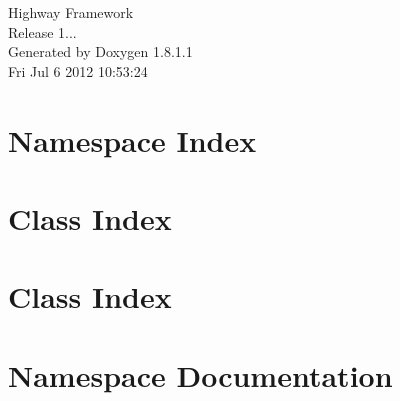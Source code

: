 \documentclass{book}
\begin{document}
\hypersetup{pageanchor=false,citecolor=blue}
\begin{titlepage}
\vspace*{7cm}
\begin{center}
{\Large Highway Framework \\[1ex]\large Release 1... }\\
\vspace*{1cm}
{\large Generated by Doxygen 1.8.1.1}\\
\vspace*{0.5cm}
{\small Fri Jul 6 2012 10:53:24}\\
\end{center}
\end{titlepage}
\clearemptydoublepage
{}
\tableofcontents
\clearemptydoublepage
{}
\hypersetup{pageanchor=true,citecolor=blue}
\chapter{Namespace Index}

\chapter{Class Index}

\chapter{Class Index}

\chapter{Namespace Documentation}

















\end{document}
